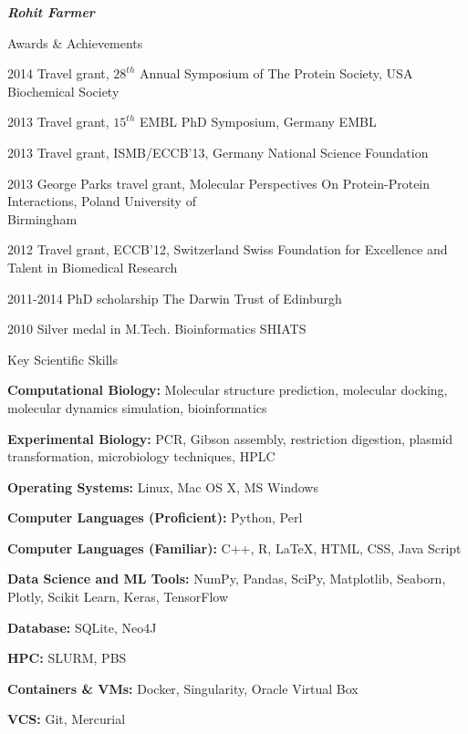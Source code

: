 \documentclass[10pt]{article}
\begin{document}
\begin{cv}{\huge \it \bfseries Rohit Farmer}
\begin{cvlist}{Awards \& Achievements}
	\item[2014] Travel grant, $28^{th}$ Annual Symposium of The Protein Society, USA \hfill Biochemical Society
	\item[2013] Travel grant, $15^{th}$ EMBL PhD Symposium, Germany \hfill EMBL
	\item[2013] Travel grant, ISMB/ECCB'13, Germany \hfill National Science Foundation
	\item[2013] George Parks travel grant,  Molecular Perspectives On Protein-Protein Interactions, Poland \hfill University of \\ \hspace*{\fill} Birmingham
	\item[2012] Travel grant, ECCB'12, Switzerland \hfill Swiss Foundation for Excellence and \\ \hspace*{\fill} Talent in Biomedical Research
	\item[2011-2014] PhD scholarship \hfill The Darwin Trust of Edinburgh
	\item[2010] Silver medal in M.Tech. Bioinformatics \hfill SHIATS
\end{cvlist}

\vskip3pt
\begin{cvlist}{Key Scientific Skills}
	\item[\textbf{Computational Biology:}] Molecular structure prediction,	molecular docking, molecular dynamics simulation, bioinformatics
	\item[\textbf{Experimental Biology:}] PCR, Gibson assembly, restriction digestion, plasmid transformation, microbiology techniques, 
	HPLC
	\item[\textbf{Operating Systems:}] Linux, Mac OS X, MS Windows
	\item[\textbf{Computer Languages (Proficient):}] Python, Perl
	\item[\textbf{Computer Languages (Familiar):}] C++, R, \LaTeX, HTML, CSS, Java Script
	\item[\textbf{Data Science and ML Tools:}] NumPy, Pandas, SciPy, Matplotlib, Seaborn, Plotly, Scikit Learn, Keras, TensorFlow
	\item[\textbf{Database:}] SQLite, Neo4J
	\item[\textbf{HPC:}] SLURM, PBS
	\item[\textbf{Containers \& VMs:}] Docker, Singularity, Oracle Virtual Box
	\item[\textbf{VCS:}] Git, Mercurial
\end{cvlist}


\end{cv}
\end{document}
